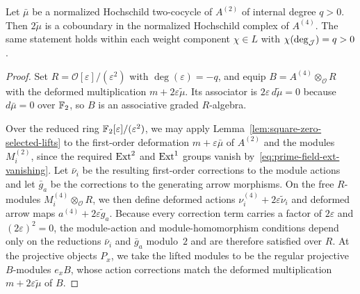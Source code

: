\begin{lemma}
\label{lem:mod-four-comparison}
Let $\bar\mu$ be a normalized Hochschild two-cocycle of $A^{(2)}$ of internal degree $q>0$. Then $2\widetilde\mu$ is a coboundary in the normalized Hochschild complex of $A^{(4)}$. The same statement holds within each weight component $\chi\in L$ with $\chi(\deg_\mathcal J)=q>0$.
\end{lemma}
\begin{proof}
Set $R=\mathcal O[\varepsilon]/(\varepsilon^2)$ with $\deg(\varepsilon)=-q$, and equip $B=A^{(4)}\otimes_{\mathcal O}R$ with the deformed multiplication $m+2\varepsilon\widetilde\mu$. Its associator is $2\varepsilon\,d\widetilde\mu=0$ because $d\bar\mu=0$ over $\mathbb F_2$, so $B$ is an associative graded $R$-algebra.

Over the reduced ring $\mathbb F_2[\varepsilon]/(\varepsilon^2)$, we may apply Lemma~\ref{lem:square-zero-selected-lifts} to the first-order deformation $m+\varepsilon\bar\mu$ of $A^{(2)}$ and the modules $M_i^{(2)}$, since the required $\operatorname{Ext}^2$ and $\operatorname{Ext}^1$ groups vanish by~\eqref{eq:prime-field-ext-vanishing}. Let $\bar\nu_i$ be the resulting first-order corrections to the module actions and let $\bar g_a$ be the corrections to the generating arrow morphisms. On the free $R$-modules $M_i^{(4)}\otimes_{\mathcal O}R$, we then define deformed actions $\nu_i^{(4)}+2\varepsilon\widetilde\nu_i$ and deformed arrow maps $a^{(4)}+2\varepsilon\widetilde g_a$. Because every correction term carries a factor of $2\varepsilon$ and $(2\varepsilon)^2=0$, the module-action and module-homomorphism conditions depend only on the reductions $\bar\nu_i$ and $\bar g_a$ modulo~$2$ and are therefore satisfied over $R$. At the projective objects $P_x$, we take the lifted modules to be the regular projective $B$-modules $e_xB$, whose action corrections match the deformed multiplication $m+2\varepsilon\widetilde\mu$ of $B$.


\end{proof}
